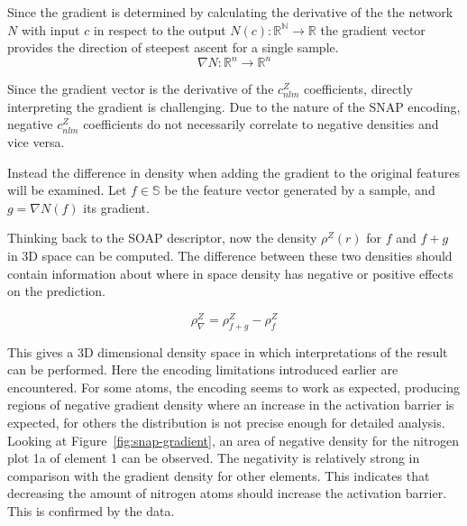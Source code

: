 Since the gradient is determined by calculating the derivative of the the network $N$ with input $c$ in respect to the output $N(c): \mathbb{R^N} \to \mathbb{R}$
the gradient vector provides the direction of steepest ascent for a single sample.
$$
\nabla N: \mathbb{R}^n  \to \mathbb{R}^n 
$$

Since the gradient vector is the derivative of the $c_{nlm}^Z$ coefficients, 
directly interpreting the gradient is challenging. 
Due to the nature of the SNAP encoding, negative $c_{nlm}^Z$ coefficients do not necessarily correlate to negative densities and vice versa.

Instead the difference in density when adding the gradient to the original features will be examined.
Let $f \in \mathbb{S}$ be the feature vector generated by a sample, and $g = \nabla N(f)$ its gradient.

Thinking back to the SOAP descriptor, now the density $\rho^Z(r)$ for $f$ and $f + g$ in 3D space can be computed.
The difference between these two densities should contain information about where in space density has negative or positive effects on the prediction.

$$ \rho^Z_\nabla = \rho^Z_{f+g} -  \rho^Z_{f} $$

This gives a 3D dimensional density space in which interpretations of the result can be performed.
Here the encoding limitations introduced earlier are encountered.
For some atoms, the encoding seems to work as expected, producing regions of negative gradient density where
an increase in the activation barrier is expected, for others the distribution is not precise enough for detailed analysis.
Looking at Figure~\ref{fig:snap-gradient}, an area of negative density for the nitrogen plot 1a of element 1 can be observed.
The negativity is relatively strong in comparison with the gradient density for other elements.
This indicates that decreasing the amount of nitrogen atoms should increase the activation barrier.
This is confirmed by the data.


